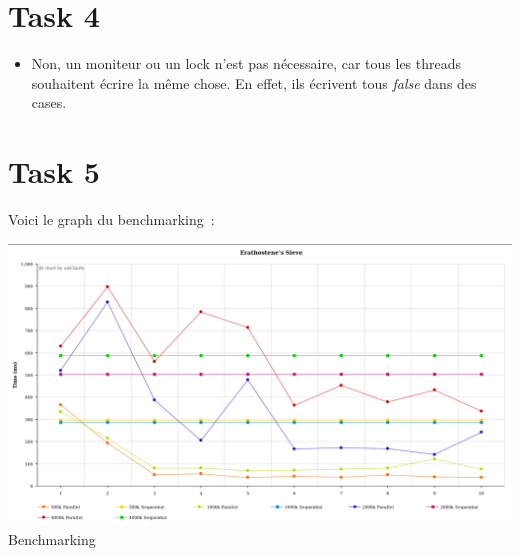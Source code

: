 \documentclass{article}
\begin{document}
\section{Task 4}
\label{sec:Task 4}

\begin{itemize}
	\item Non, un moniteur ou un lock n'est pas nécessaire, car tous les threads souhaitent écrire la même chose. En effet, ils écrivent tous \emph{false} dans des cases.
\end{itemize}

\section{Task 5}
\label{sec:Task 5}

Voici le graph du benchmarking~:
\begin{center}
	\includegraphics[scale=0.37]{../results/graphTests}\\
	Benchmarking
	\label{1}
\end{center}
\end{document}
